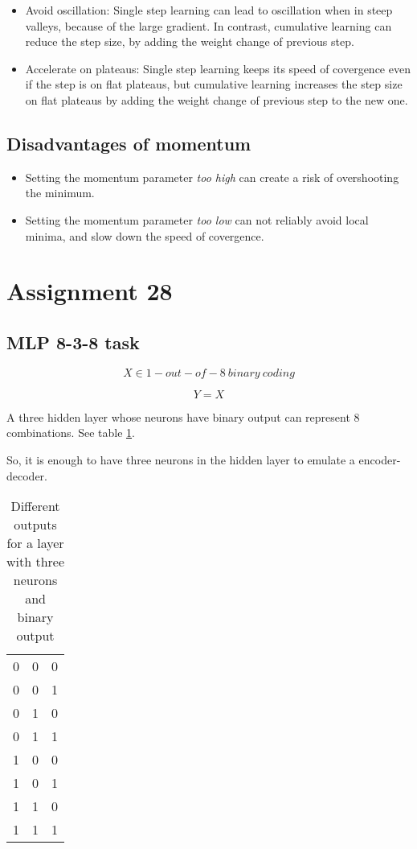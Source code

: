 \documentclass[12pt]{article}
\begin{document}
\begin{itemize}

    \item Avoid oscillation: Single step learning can lead to oscillation when in steep
valleys, because of the large gradient. In contrast, cumulative learning can
reduce the step size, by adding the weight change of previous step.

    \item Accelerate on plateaus: Single step learning keeps its speed of covergence even
if the step is on flat plateaus, but cumulative learning increases the step
size on flat plateaus by adding the weight change of previous step to the new
one.

\end{itemize}

\subsection{Disadvantages of momentum}

\begin{itemize}

    \item Setting the momentum parameter \textit{too high} can create a risk of overshooting the
minimum.

    \item Setting the momentum parameter \textit{too low} can not reliably avoid local minima, and
slow down the speed of covergence.

\end{itemize}
\newpage

\section{Assignment 28}

\subsection{MLP 8-3-8 task}

$$ X \in 1-out-of-8\:binary\:coding $$

$$ Y = X $$

A three hidden layer whose neurons have binary output can represent 8
combinations. See table \ref{comb}.

So, it is enough to have three neurons in the hidden layer to emulate a
encoder-decoder.

\begin{table}
    \centering
    \begin{tabular}{l c r}
        0& 0 &0 \\
        0& 0 &1 \\
        0& 1 &0 \\
        0& 1 &1 \\
        1& 0 &0 \\
        1& 0 &1 \\
        1& 1 &0 \\
        1& 1 &1 \\
    \end{tabular}
    \caption{Different outputs for a layer with three neurons and binary output}
    \label{comb}
\end{table}
\end{document}
